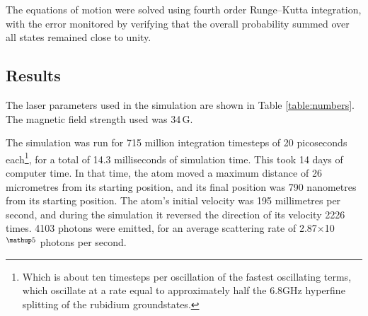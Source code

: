 The equations of motion were solved using fourth order Runge--Kutta integration, with the error monitored by verifying that the overall probability summed over all states remained close to unity.

\subsection{Results}

\begin{table}
    \renewcommand{\arraystretch}{2.0}
    \caption{The parameters used in the laser cooling simulations. There are four lasers, each with a specified polarisation, intensity, and detuning from the transition it targets.}\label{table:numbers}
\end{table}

The laser parameters used in the simulation are shown in Table \ref{table:numbers}. The magnetic field strength used was 34$\,$G.

The simulation was run for 715 million integration timesteps of 20 picoseconds each\footnote{Which is about ten timesteps per oscillation of the fastest oscillating terms, which oscillate at a rate equal to approximately half the 6.8GHz hyperfine splitting of the rubidium groundstates.}, for a total of 14.3 milliseconds of simulation time. This took 14 days of computer time. In that time, the atom moved a maximum distance of 26 micrometres from its starting position, and its final position was 790 nanometres from its starting position. The atom's initial velocity was 195 millimetres per second, and during the simulation it reversed the direction of its velocity 2226 times. 4103 photons were emitted, for an average scattering rate of 2.87$\times$10$^\up{5}$ photons per second.

